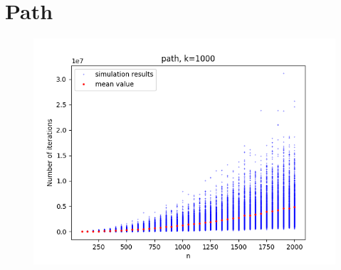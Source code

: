 \documentclass{article}
\begin{document}
\section{Path}
\begin{figure}[htp]
    \centering
      \includegraphics[width=0.5\linewidth]{path.png}
      \label{fig:path}
\end{figure}
\end{document}
